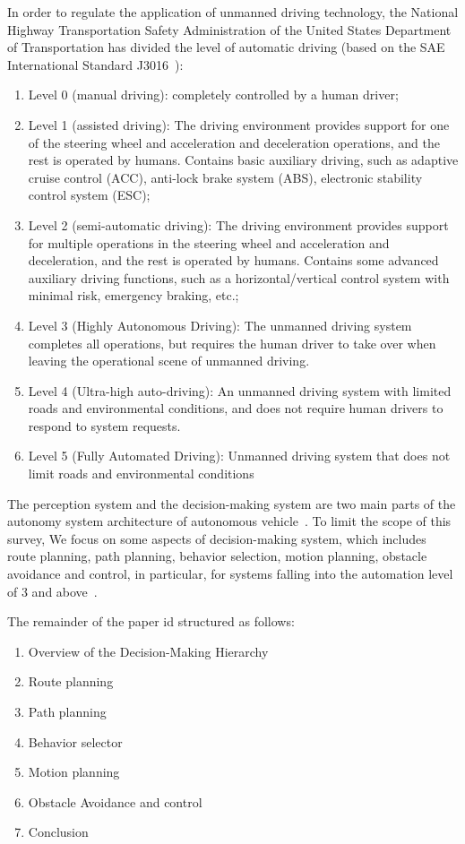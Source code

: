 \documentclass[conference]{IEEEtran}
\begin{document}
In order to regulate the application of unmanned driving technology, the National Highway Transportation Safety Administration of the United States Department of Transportation has divided the level of automatic driving (based on the SAE International Standard J3016~\cite{sae2018taxonomy}):
\begin{enumerate}
	\item Level 0 (manual driving): completely controlled by a human driver;
	\item Level 1 (assisted driving): The driving environment provides support for one of the steering wheel and acceleration and deceleration operations, and the rest is operated by humans. Contains basic auxiliary driving, such as adaptive cruise control (ACC), anti-lock brake system (ABS), electronic stability control system (ESC);
	\item Level 2 (semi-automatic driving): The driving environment provides support for multiple operations in the steering wheel and acceleration and deceleration, and the rest is operated by humans.  Contains some advanced auxiliary driving functions, such as a horizontal/vertical control system with minimal risk, emergency braking, etc.;
	\item Level 3 (Highly Autonomous Driving): The unmanned driving system completes all operations, but requires the human driver to take over when leaving the operational scene of unmanned driving.
	\item Level 4 (Ultra-high auto-driving): An unmanned driving system with limited roads and environmental conditions, and does not require human drivers to respond to system requests.
	\item Level 5 (Fully Automated Driving): Unmanned driving system that does not limit roads and environmental conditions
\end{enumerate}

The perception system and the decision-making system are two main parts of the autonomy system architecture of autonomous vehicle~\cite{Brian2016}. To limit the scope of this survey, We focus on some aspects of decision-making system, which includes route planning, path planning, behavior selection, motion planning, obstacle avoidance and control, in particular, for systems falling into the automation level of 3 and above~\cite{self_driving}.

The remainder of the paper id structured as follows:
\begin{enumerate}
	\item Overview of the Decision-Making Hierarchy
	\item Route planning
	\item Path planning
	\item Behavior selector
	\item Motion planning
	\item Obstacle Avoidance and control
	\item Conclusion
\end{enumerate}
\end{document}

